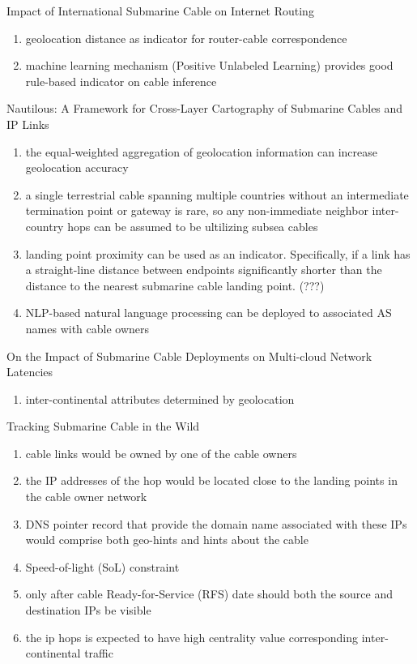 \documentclass[twocolumn]{article}
\begin{document}
Impact of International Submarine Cable on Internet Routing
\begin{enumerate}
    \item geolocation distance as indicator for router-cable correspondence
    \item machine learning mechanism (Positive Unlabeled Learning) provides good rule-based indicator on cable inference
\end{enumerate}

Nautilous: A Framework for Cross-Layer Cartography of Submarine Cables and IP Links
\begin{enumerate}
    \item the equal-weighted aggregation of geolocation information can increase geolocation accuracy
    \item a single terrestrial cable spanning multiple countries without an intermediate termination point or gateway is rare, so any non-immediate neighbor inter-country hops can be assumed to be ultilizing subsea cables
    \item landing point proximity can be used as an indicator. Specifically, if a link has a straight-line distance between endpoints significantly shorter than the distance to the nearest submarine cable landing point. (???)
    \item NLP-based natural language processing can be deployed to associated AS names with cable owners
\end{enumerate}

On the Impact of Submarine Cable Deployments on Multi-cloud Network Latencies
\begin{enumerate}
    \item inter-continental attributes determined by geolocation
\end{enumerate}

Tracking Submarine Cable in the Wild
\begin{enumerate}
    \item cable links would be owned by one of the cable owners
    \item the IP addresses of the hop would be located close to the landing points in the cable owner network
    \item DNS pointer record that provide the domain name associated with these IPs would comprise both geo-hints and hints about the cable
    \item Speed-of-light (SoL) constraint
    \item only after cable Ready-for-Service (RFS) date should both the source and destination IPs be visible
    \item the ip hops is expected to have high centrality value corresponding inter-continental traffic
\end{enumerate}
\end{document}
